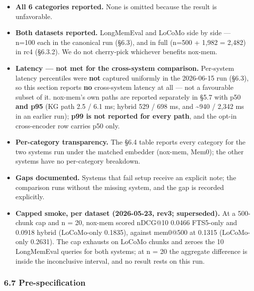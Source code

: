 \documentclass[
]{article}
\providecommand{\tightlist}{%
  \setlength{\itemsep}{0pt}\setlength{\parskip}{0pt}}
\begin{document}
\begin{itemize}
\tightlist
\item
  \textbf{All 6 categories reported.} None is omitted because the result
  is unfavorable.
\item
  \textbf{Both datasets reported.} LongMemEval and LoCoMo side by side
  --- n=100 each in the canonical run (§6.3), and in full (n=500 + 1,982
  = 2,482) in rc4 (§6.3.2). We do not cherry-pick whichever benefits
  nox-mem.
\item
  \textbf{Latency --- not met for the cross-system comparison.}
  Per-system latency percentiles were \textbf{not} captured uniformly in
  the 2026-06-15 run (§6.3), so this section reports \textbf{no}
  cross-system latency at all --- not a favourable subset of it.
  nox-mem's own paths are reported separately in §5.7 with p50
  \textbf{and p95} (KG path 2.5 / 6.1 ms; hybrid 529 / 698 ms, and
  \textasciitilde940 / 2,342 ms in an earlier run); \textbf{p99 is not
  reported for every path}, and the opt-in cross-encoder row carries p50
  only.
\item
  \textbf{Per-category transparency.} The §6.4 table reports every
  category for the two systems run under the matched embedder (nox-mem,
  Mem0); the other systems have no per-category breakdown.
\item
  \textbf{Gaps documented.} Systems that fail setup receive an explicit
  note; the comparison runs without the missing system, and the gap is
  recorded explicitly.
\item
  \textbf{Capped smoke, per dataset (2026-05-23, rev3; superseded).} At
  a 500-chunk cap and n = 20, nox-mem scored nDCG@10 0.0466 FTS5-only
  and 0.0918 hybrid (LoCoMo-only 0.1835), against mem0@500 at 0.1315
  (LoCoMo-only 0.2631). The cap exhausts on LoCoMo chunks and zeroes the
  10 LongMemEval queries for both systems; at n = 20 the aggregate
  difference is inside the inconclusive interval, and no result rests on
  this run.
\end{itemize}

\subsubsection{6.7 Pre-specification}\label{pre-specification}
\end{document}
